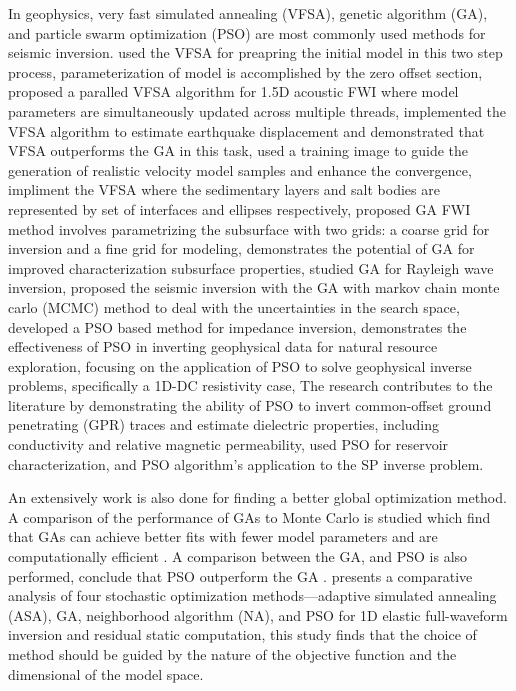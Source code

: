\documentclass[paper,revised]{geophysics}
\begin{document}
\par
In geophysics, very fast simulated annealing (VFSA), genetic algorithm (GA), and particle swarm optimization (PSO) are most commonly used methods for seismic inversion. \cite{Datta2016} used the VFSA for preapring the initial model in this two step process, parameterization of model is accomplished by the zero offset section, \cite{Fu2021} proposed a paralled VFSA algorithm  for 1.5D acoustic FWI where model parameters are simultaneously updated across multiple threads, \cite{Shiba2005} implemented the VFSA algorithm to estimate earthquake displacement and demonstrated that VFSA outperforms the GA in this task, \cite{Mendes2024} used a training image to guide the generation of realistic velocity model samples and enhance the convergence, \cite{Datta2019} impliment the VFSA where the sedimentary layers and salt bodies are represented by set of interfaces and ellipses respectively, \cite{Mazzotti2016} proposed GA FWI method involves parametrizing the subsurface with two grids: a coarse grid for inversion and a fine grid for modeling, \cite{ktran2012} demonstrates the potential of GA  for improved characterization subsurface properties, \cite{Zeng2011} studied GA for Rayleigh wave inversion, \cite{Aleardi2017} proposed the seismic inversion with the GA with markov chain monte carlo (MCMC) method to deal with the uncertainties in the search space, \cite{Yang2017} developed a PSO based method for impedance inversion, \cite{Shaw2007} demonstrates the effectiveness of PSO in inverting geophysical data for natural resource exploration, \cite{Ding2015} focusing on the application of PSO to solve geophysical inverse problems, specifically a 1D-DC resistivity case, \cite{Kaplanvural2020} The research contributes to the literature by demonstrating the ability of PSO to invert common-offset ground penetrating (GPR) traces and estimate dielectric properties, including conductivity and relative magnetic permeability, \cite{Fernandez-Martinez2010} used PSO for reservoir characterization, and \cite{Fern2010} PSO algorithm's application to the SP inverse problem.
\par
An extensively work is also done for finding a better global optimization method. A comparison of the performance of GAs to Monte Carlo is studied which find that GAs can achieve better fits with fewer model parameters and are computationally efficient \citep{Sambridge1992}. A comparison between the GA, and PSO is also performed, conclude that PSO outperform the GA \citep{Ding2015, Mojica2019}. \cite{Sajeva2017} presents a comparative analysis of four stochastic optimization methods—adaptive simulated annealing (ASA), GA, neighborhood algorithm (NA), and PSO for 1D elastic full-waveform inversion and residual static computation, this study finds that the choice of method should be guided by the nature of the objective function and the dimensional of the model space.
\end{document}
